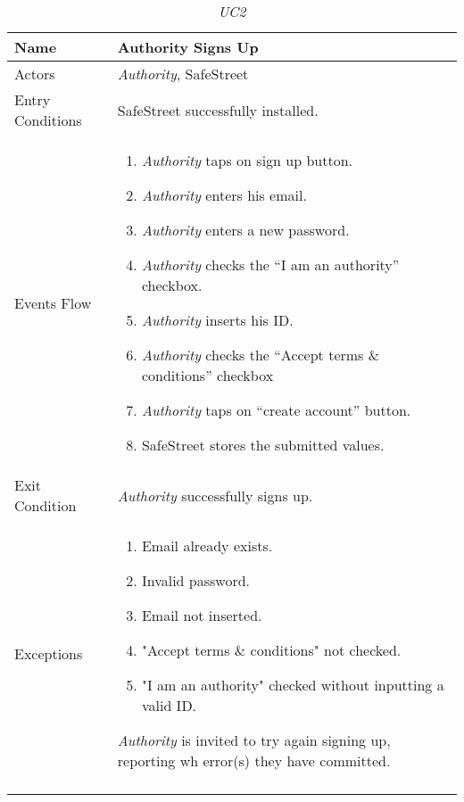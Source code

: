 \documentclass[../../../RASD.tex]{subfiles}
\begin{document}
    \begin{center}
        \begin{longtable}{| p{.35\linewidth} | p{.65\linewidth} |}

            \hline
            \textbf{Name} & \textbf{Authority Signs Up}\\ \hline
            Actors & \textit{Authority}, SafeStreet\\ \hline
            Entry Conditions & SafeStreet successfully installed.\\ \hline
            Events Flow &
            \begin{enumerate}
                \item \textit{Authority} taps on sign up button.
                \item \textit{Authority} enters his email.
                \item \textit{Authority} enters a new password.
                \item \textit{Authority} checks the “I am an authority” checkbox.
                \item \textit{Authority} inserts his ID.
                \item \textit{Authority} checks the “Accept terms \& conditions” checkbox
                \item \textit{Authority} taps on “create account” button.
                \item SafeStreet stores the submitted values.
            \end{enumerate}
            \\ \hline
            Exit Condition & \textit{Authority} successfully signs up.\\ \hline
            Exceptions &
            \begin{enumerate}
                \item Email already exists.
                \item Invalid password.
                \item Email not inserted.
                \item "Accept terms \& conditions" not checked.
                \item "I am an authority" checked without inputting a valid ID.
            \end{enumerate}
            \textit{Authority} is invited to try again signing up, reporting wh error(s) they have committed. \\
            \hline
            \caption{\textit{UC2}}
        \end{longtable}
    \end{center}
\end{document}
